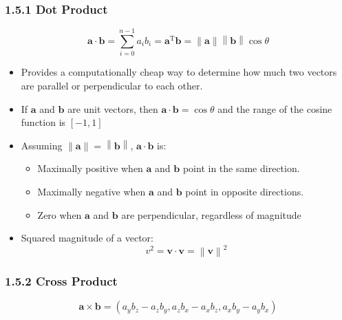 \documentclass[11pt]{article}
\newcommand{\bm}[1]{\mathbf{#1}}
\newcommand{\norm}[1]{\left\|#1\right\|}
\begin{document}
\subsubsection*{1.5.1 Dot Product}
\begin{equation}
    \bm{a} \cdot \bm{b} = \sum_{i=0}^{n-1} a_i b_i
    = \bm{a}^\text{T} \bm{b}
    = \left\|\bm{a}\right\| \norm{\bm{b}} \cos \theta
\end{equation}
\begin{itemize}
    \item Provides a computationally cheap way to determine how much two vectors are parallel or perpendicular to each other.
    \item If $\bm{a}$ and $\bm{b}$ are unit vectors, then $\bm{a} \cdot \bm{b} = \cos \theta$ and the range of the cosine function is $[-1, 1]$
    \item Assuming $\norm{\bm{a}} = \norm{\bm{b}}$, $\bm{a} \cdot \bm{b}$ is:
    \begin{itemize}
        \item Maximally positive when $\bm{a}$ and $\bm{b}$ point in the same direction.
        \item Maximally negative when $\bm{a}$ and $\bm{b}$ point in opposite directions.
        \item Zero when $\bm{a}$ and $\bm{b}$ are perpendicular, regardless of magnitude
    \end{itemize}
    \item Squared magnitude of a vector:
        \begin{equation}
            v^2 = \bm{v} \cdot \bm{v} = \norm{\bm{v}}^2
        \end{equation}
\end{itemize}

\subsubsection*{1.5.2 Cross Product}
\begin{equation}
    \bm{a} \times \bm{b} =
        \left(a_y b_z - a_z b_y, a_z b_x - a_x b_z, a_x b_y - a_y b_x\right)
\end{equation}
\end{document}
